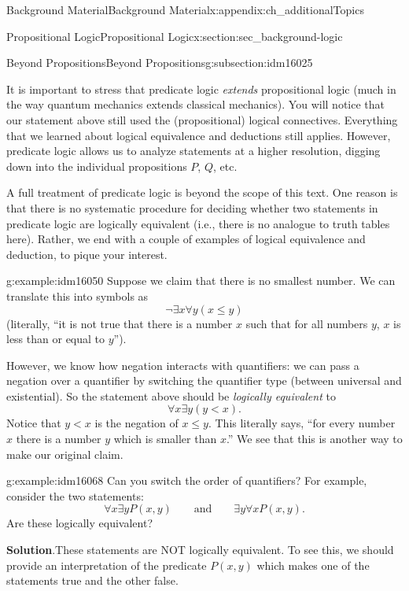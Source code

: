 \documentclass[oneside,10pt,]{book}
\numberwithin{equation}{chapter}
\newcommand{\lt}{<}
\begin{document}
\begin{appendixptx}{Background Material}{}{Background Material}{}{}{x:appendix:ch_additionalTopics}
\begin{sectionptx}{Propositional Logic}{}{Propositional Logic}{}{}{x:section:sec_background-logic}
\begin{subsectionptx}{Beyond Propositions}{}{Beyond Propositions}{}{}{g:subsection:idm16025}
\par
It is important to stress that predicate logic \emph{extends} propositional logic (much in the way quantum mechanics extends classical mechanics).  You will notice that our statement above still used the (propositional) logical connectives.  Everything that we learned about logical equivalence and deductions still applies.  However, predicate logic allows us to analyze statements at a higher resolution, digging down into the individual propositions \(P\), \(Q\), etc.%
\par
A full treatment of predicate logic is beyond the scope of this text.  One reason is that there is no systematic procedure for deciding whether two statements in predicate logic are logically equivalent (i.e., there is no analogue to truth tables here).  Rather, we end with a couple of examples of logical equivalence and deduction, to pique your interest.%
\begin{example}{}{g:example:idm16050}%
Suppose we claim that there is no smallest number.  We can translate this into symbols as%
\begin{equation*}
\neg \exists x \forall y (x \le y)
\end{equation*}
(literally, ``it is not true that there is a number \(x\) such that for all numbers \(y\), \(x\) is less than or equal to \(y\)'').%
\par
However, we know how negation interacts with quantifiers: we can pass a negation over a quantifier by switching the quantifier type (between universal and existential).  So the statement above should be \emph{logically equivalent} to%
\begin{equation*}
\forall x \exists y (y \lt x).
\end{equation*}
Notice that \(y \lt x\) is the negation of \(x \le y\).  This literally says, ``for every number \(x\) there is a number \(y\) which is smaller than \(x\).''  We see that this is another way to make our original claim.%
\end{example}
\begin{example}{}{g:example:idm16068}%
Can you switch the order of quantifiers? For example, consider the two statements:%
\begin{equation*}
\forall x \exists y P(x,y) \qquad \mathrm{ and } \qquad \exists y \forall x P(x,y).
\end{equation*}
Are these logically equivalent?%
\par\smallskip%
\noindent\textbf{Solution}.\hypertarget{g:solution:idm16072}{}\quad{}These statements are NOT logically equivalent. To see this, we should provide an interpretation of the predicate \(P(x,y)\) which makes one of the statements true and the other false.%

\end{example}
\end{subsectionptx}
\end{sectionptx}
\end{appendixptx}
\end{document}
